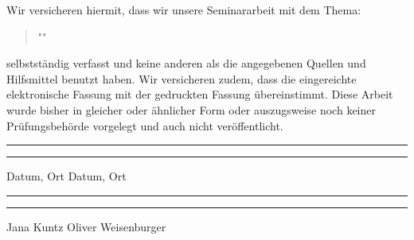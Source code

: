 Wir versicheren hiermit, dass wir unsere Seminararbeit mit dem Thema:    \begin{quote}
"\ThesisTitle "
\end{quote} selbstständig verfasst und keine anderen als die angegebenen Quellen und Hilfsmittel benutzt haben. Wir versicheren zudem, dass die eingereichte elektronische Fassung mit der
gedruckten Fassung übereinstimmt.
Diese Arbeit wurde bisher in gleicher oder ähnlicher Form oder auszugsweise
noch keiner Prüfungsbehörde vorgelegt und auch nicht veröffentlicht.

\vspace{50pt} 
\noindent\rule{5cm}{.4pt}\hfill\rule{5cm}{.4pt}\par 
\noindent Datum, Ort  \hspace{7,4cm} Datum, Ort 
\par
\vspace{2cm}
\par
\noindent\rule{5cm}{.4pt}\hfill\rule{5cm}{.4pt}\par 
\noindent Jana Kuntz \hspace{7,4cm} Oliver Weisenburger
